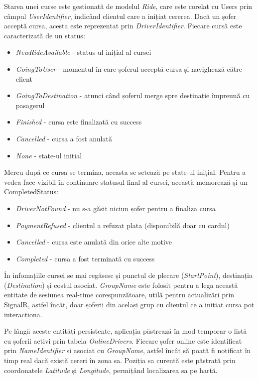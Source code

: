 Starea unei curse este gestionată de modelul \textit{Ride}, care este corelat cu Users prin câmpul \textit{UserIdentifier}, indicând clientul 
care a inițiat cererea. Dacă un șofer acceptă cursa, acesta este reprezentat prin \textit{DriverIdentifier}. Fiecare cursă este 
caracterizată de un status:
\begin{itemize}
    \item \textit{NewRideAvailable} - status-ul inițial al cursei
    \item \textit{GoingToUser} - momentul în care șoferul acceptă cursa și navighează către client
    \item \textit{GoingToDestination} - atunci când șoferul merge spre destinație împreună cu pasagerul
    \item \textit{Finished} - cursa este finalizată cu success
    \item \textit{Cancelled} - cursa a fost anulată
    \item \textit{None} - state-ul inițial
\end{itemize}
Mereu după ce cursa se termina, aceasta se setează pe state-ul inițial.
Pentru a vedea face vizibil în continuare statusul final al cursei, această memorează și un CompletedStatus:
\begin{itemize}
    \item \textit{DriverNotFound} - nu s-a găsit niciun șofer pentru a finaliza cursa
    \item \textit{PaymentRefused} - clientul a refuzat plata (disponibilă doar cu cardul)
    \item \textit{Cancelled} - cursa este anulată din orice alte motive 
    \item \textit{Completed} - cursa a fost terminată cu success
\end{itemize}
În infomațiile cursei se mai regăsesc și punctul de plecare (\textit{StartPoint}),
destinația (\textit{Destination}) și costul asociat. \textit{GroupName} este folosit pentru a lega această entitate de sesiunea real-time 
corespunzătoare, utilă pentru actualizări prin SignalR, astfel încât, doar șoferii din același grup cu clientul ce a inițiat cursa pot interacționa.


Pe lângă aceste entități persistente, aplicația păstrează în mod temporar o listă cu șoferii activi prin tabela \textit{OnlineDrivers}.
Fiecare șofer online este identificat prin \textit{NameIdentifier} și asociat cu \textit{GroupName}, astfel încât să poată fi notificat
în timp real dacă există cereri în zona sa. Poziția sa curentă este păstrată prin coordonatele \textit{Latitude} și \textit{Longitude},
permițând localizarea sa pe hartă.

